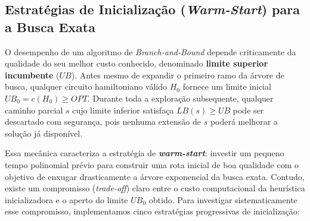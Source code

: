 \subsection{Estratégias de Inicialização (\textit{Warm-Start}) para a Busca Exata}
\label{sec:warm_starts}

O desempenho de um algoritmo de \textit{Branch-and-Bound} depende criticamente da qualidade do
seu melhor custo conhecido, denominado \textbf{limite superior incumbente} ($UB$). Antes mesmo
de expandir o primeiro ramo da árvore de busca, qualquer circuito hamiltoniano válido $H_0$
fornece um limite inicial $UB_0 = c(H_0) \ge OPT$. Durante toda a exploração subsequente,
qualquer caminho parcial $s$ cujo limite inferior satisfaça $LB(s) \ge UB$ pode ser descartado
com segurança, pois nenhuma extensão de $s$ poderá melhorar a solução já disponível.

Essa mecânica caracteriza a estratégia de \textbf{\textit{warm-start}}: investir um pequeno
tempo polinomial prévio para construir uma rota inicial de boa qualidade com o objetivo de
enxugar drasticamente a árvore exponencial da busca exata. Contudo, existe um compromisso
(\textit{trade-off}) claro entre o custo computacional da heurística inicializadora e o aperto
do limite $UB_0$ obtido. Para investigar sistematicamente esse compromisso, implementamos cinco
estratégias progressivas de inicialização:

